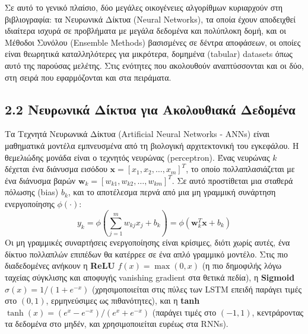 Σε αυτό το γενικό πλαίσιο, δύο μεγάλες οικογένειες αλγορίθμων κυριαρχούν στη βιβλιογραφία: τα Νευρωνικά Δίκτυα (Neural Networks), τα οποία έχουν αποδειχθεί ιδιαίτερα ισχυρά σε προβλήματα με μεγάλα δεδομένα και πολύπλοκη δομή, και οι Μέθοδοι Συνόλου (Ensemble Methods) βασισμένες σε δέντρα αποφάσεων, οι οποίες είναι θεωρητικά καταλληλότερες για μικρότερα, δομημένα (tabular) datasets όπως αυτό της παρούσας μελέτης. Στις ενότητες που ακολουθούν αναπτύσσονται και οι δύο, στη σειρά που εφαρμόζονται και στα πειράματα.

\subsection{2.2 Νευρωνικά Δίκτυα για Ακολουθιακά Δεδομένα}

Τα Τεχνητά Νευρωνικά Δίκτυα (Artificial Neural Networks - ANNs) είναι μαθηματικά μοντέλα εμπνευσμένα από τη βιολογική αρχιτεκτονική του εγκεφάλου. Η θεμελιώδης μονάδα είναι ο τεχνητός νευρώνας (perceptron). Ένας νευρώνας $k$ δέχεται ένα διάνυσμα εισόδου $\mathbf{x} = [x_1, x_2, \ldots, x_m]^T$, το οποίο πολλαπλασιάζεται με ένα διάνυσμα βαρών $\mathbf{w}_k = [w_{k1}, w_{k2}, \ldots, w_{km}]^T$. Σε αυτό προστίθεται μια σταθερά πόλωσης (bias) $b_k$, και το αποτέλεσμα περνά από μια μη γραμμική συνάρτηση ενεργοποίησης $\phi(\cdot)$:
$$y_k = \phi \left( \sum_{j=1}^{m} w_{kj} x_j + b_k \right) = \phi(\mathbf{w}_k^T \mathbf{x} + b_k)$$
Οι μη γραμμικές συναρτήσεις ενεργοποίησης είναι κρίσιμες, διότι χωρίς αυτές, ένα δίκτυο πολλαπλών επιπέδων θα κατέρρεε σε ένα απλό γραμμικό μοντέλο. Στις πιο διαδεδομένες ανήκουν η \textbf{ReLU} $f(x) = \max(0, x)$ (η πιο δημοφιλής λόγω ταχείας σύγκλισης και αποφυγής vanishing gradient στα θετικά πεδία), η \textbf{Sigmoid} $\sigma(x) = 1 / (1 + e^{-x})$ (χρησιμοποιείται στις πύλες των LSTM επειδή παράγει τιμές στο $(0,1)$, ερμηνεύσιμες ως πιθανότητες), και η \textbf{tanh} $\tanh(x) = (e^x - e^{-x})/(e^x + e^{-x})$ (παράγει τιμές στο $(-1,1)$, κεντράροντας τα δεδομένα στο μηδέν, και χρησιμοποιείται ευρέως στα RNNs).


